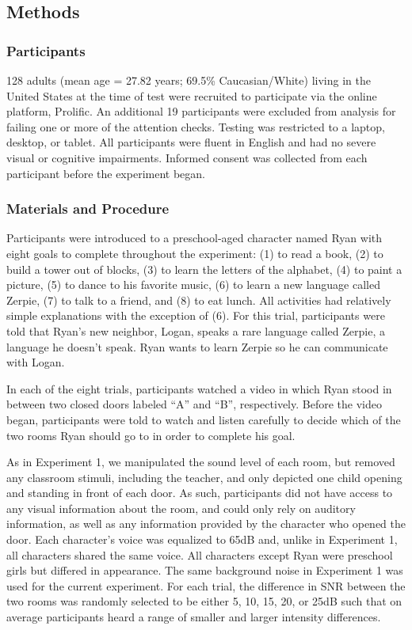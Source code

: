 \documentclass[10pt, letterpaper]{article}
\begin{document}
\hypertarget{methods-2}{%
\subsection{Methods}\label{methods-2}}

\hypertarget{participants-2}{%
\subsubsection{Participants}\label{participants-2}}

128 adults (mean age = 27.82 years; 69.5\% Caucasian/White) living in
the United States at the time of test were recruited to participate via
the online platform, Prolific. An additional 19 participants were
excluded from analysis for failing one or more of the attention checks.
Testing was restricted to a laptop, desktop, or tablet. All participants
were fluent in English and had no severe visual or cognitive
impairments. Informed consent was collected from each participant before
the experiment began.

\hypertarget{materials-and-procedure-2}{%
\subsubsection{Materials and
Procedure}\label{materials-and-procedure-2}}

Participants were introduced to a preschool-aged character named Ryan
with eight goals to complete throughout the experiment: (1) to read a
book, (2) to build a tower out of blocks, (3) to learn the letters of
the alphabet, (4) to paint a picture, (5) to dance to his favorite
music, (6) to learn a new language called Zerpie, (7) to talk to a
friend, and (8) to eat lunch. All activities had relatively simple
explanations with the exception of (6). For this trial, participants
were told that Ryan's new neighbor, Logan, speaks a rare language called
Zerpie, a language he doesn't speak. Ryan wants to learn Zerpie so he
can communicate with Logan.

In each of the eight trials, participants watched a video in which Ryan
stood in between two closed doors labeled ``A'' and ``B'', respectively.
Before the video began, participants were told to watch and listen
carefully to decide which of the two rooms Ryan should go to in order to
complete his goal.

As in Experiment 1, we manipulated the sound level of each room, but
removed any classroom stimuli, including the teacher, and only depicted
one child opening and standing in front of each door. As such,
participants did not have access to any visual information about the
room, and could only rely on auditory information, as well as any
information provided by the character who opened the door. Each
character's voice was equalized to 65dB and, unlike in Experiment 1, all
characters shared the same voice. All characters except Ryan were
preschool girls but differed in appearance. The same background noise in
Experiment 1 was used for the current experiment. For each trial, the
difference in SNR between the two rooms was randomly selected to be
either 5, 10, 15, 20, or 25dB such that on average participants heard a
range of smaller and larger intensity differences.
\end{document}
